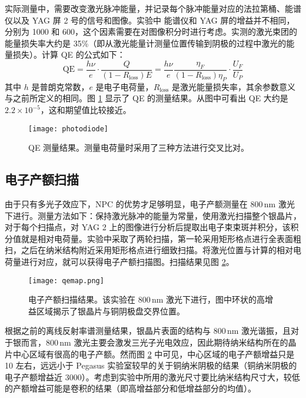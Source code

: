 实际测量中，需要改变激光脉冲能量，并记录每个脉冲能量对应的法拉第桶、能谱仪以及 YAG 屏 2 号的信号和图像。实验中 能谱仪和 YAG 屏的增益并不相同，分别为 1000 和 600，这个因素需要在对图像积分时进行考虑。实测的激光束团的能量损失率大约是 35\%（即从激光能量计测量位置传输到阴极的过程中激光的能量损失）。计算 QE 的公式如下：
\begin{equation}
\label{eq:QE}
\text{QE} = \frac{h\nu}{e}\cdot\frac{Q}{(1-R_{\text{loss}})E} = \frac{h\nu}{e}\frac{\eta_F}{(1-R_{\text{loss}})\eta_P}\cdot\frac{U_F}{U_P}
\end{equation}
其中 $h$ 是普朗克常数，$e$ 是电子电荷量，$R_{\text{loss}}$ 是激光能量损失率，其余参数意义与之前所定义的相同。图 \ref{fig:QE} 显示了 QE 的测量结果。从图中可看出 QE 大约是 $2.2\times 10^{-5}$，这和期望值比较接近。

\begin{figure}[htbp]
\begin{center}
\texttt{[image: photodiode]}
\caption{\label{fig:QE} QE 测量结果。测量电荷量时采用了三种方法进行交叉比对。}
\end{center}
\end{figure}

\subsection{电子产额扫描}
由于只有多光子效应下，NPC 的优势才足够明显，电子产额测量在 800\,nm 激光下进行。测量方法如下：保持激光脉冲的能量为常量，使用激光扫描整个银晶片，对于每个扫描点，对 YAG 2 上的图像进行分析后提取出电子束束斑并积分，该积分值就是相对电荷量。实验中采取了两轮扫描，第一轮采用矩形格点进行全表面粗扫，之后在纳米结构附近采用矩形格点进行细致扫描。将激光位置与计算的相对电荷量进行对应，就可以获得电子产额扫描图。扫描结果见图 \ref{fig:qemap}。
\begin{figure}[htbp]
\begin{center}
\texttt{[image: qemap.png]}
\caption{\label{fig:qemap} 电子产额扫描结果。该实验在 800\,nm 激光下进行，图中环状的高增益区域揭示了银晶片与铜阴极盘交界位置。}
\end{center}
\end{figure}

根据之前的离线反射率谱测量结果，银晶片表面的结构与 800\,nm 激光谐振，且对于银而言，800\,nm 激光主要会激发三光子光电效应，因此期待纳米结构所在的晶片中心区域有很高的电子产额。然而图 \ref{fig:qemap} 中可见，中心区域的电子产额增益只是 10 左右，远远小于 Pegasus 实验室较早的关于铜纳米阴极的结果（铜纳米阴极的电子产额增益近 3000）。考虑到实验中所用的激光尺寸要比纳米结构尺寸大，较低的产额增益可能是卷积的结果（即高增益部分和低增益部分的均值）。

